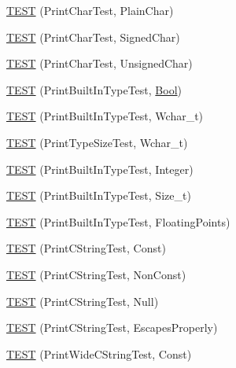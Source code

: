 \begin{DoxyCompactItemize}
\mbox{\hyperlink{namespacetesting_1_1gtest__printers__test_aa0a012b88bd8dee46707bf308aa312d1}{T\+E\+ST}} (Print\+Char\+Test, Plain\+Char)
\item 
\mbox{\hyperlink{namespacetesting_1_1gtest__printers__test_a08fe11b61c0ff62931f0172dc05c971b}{T\+E\+ST}} (Print\+Char\+Test, Signed\+Char)
\item 
\mbox{\hyperlink{namespacetesting_1_1gtest__printers__test_a54554ba079349cf09dcb6d522cfb70de}{T\+E\+ST}} (Print\+Char\+Test, Unsigned\+Char)
\item 
\mbox{\hyperlink{namespacetesting_1_1gtest__printers__test_a6f08c464dc0b8eb822368f552d4467ad}{T\+E\+ST}} (Print\+Built\+In\+Type\+Test, \mbox{\hyperlink{struct_bool}{Bool}})
\item 
\mbox{\hyperlink{namespacetesting_1_1gtest__printers__test_ab567ebd97eff0a4b9a20a5f5cb77d678}{T\+E\+ST}} (Print\+Built\+In\+Type\+Test, Wchar\+\_\+t)
\item 
\mbox{\hyperlink{namespacetesting_1_1gtest__printers__test_a705ec4c2886606a22194107397fceea6}{T\+E\+ST}} (Print\+Type\+Size\+Test, Wchar\+\_\+t)
\item 
\mbox{\hyperlink{namespacetesting_1_1gtest__printers__test_a278d53e99390c7b31ff531524fe5e86e}{T\+E\+ST}} (Print\+Built\+In\+Type\+Test, Integer)
\item 
\mbox{\hyperlink{namespacetesting_1_1gtest__printers__test_a991dc124d153742c3ca126b2fa9ccab5}{T\+E\+ST}} (Print\+Built\+In\+Type\+Test, Size\+\_\+t)
\item 
\mbox{\hyperlink{namespacetesting_1_1gtest__printers__test_acde0b28d177604ddb5e185d7b107f6f7}{T\+E\+ST}} (Print\+Built\+In\+Type\+Test, Floating\+Points)
\item 
\mbox{\hyperlink{namespacetesting_1_1gtest__printers__test_a6cd47b21ad8d9ac66ba57b5b6415a924}{T\+E\+ST}} (Print\+C\+String\+Test, Const)
\item 
\mbox{\hyperlink{namespacetesting_1_1gtest__printers__test_a89d9905fecee1b976c26d35498734dd4}{T\+E\+ST}} (Print\+C\+String\+Test, Non\+Const)
\item 
\mbox{\hyperlink{namespacetesting_1_1gtest__printers__test_ad29b97d58a4d1e5e8dd4d854f66b9e22}{T\+E\+ST}} (Print\+C\+String\+Test, Null)
\item 
\mbox{\hyperlink{namespacetesting_1_1gtest__printers__test_a140030b990011abab91d4c0b59f21edd}{T\+E\+ST}} (Print\+C\+String\+Test, Escapes\+Properly)
\item 
\mbox{\hyperlink{namespacetesting_1_1gtest__printers__test_a4caa1f81979cdc6f5ada95e01a4fae63}{T\+E\+ST}} (Print\+Wide\+C\+String\+Test, Const)

\end{DoxyCompactItemize}
